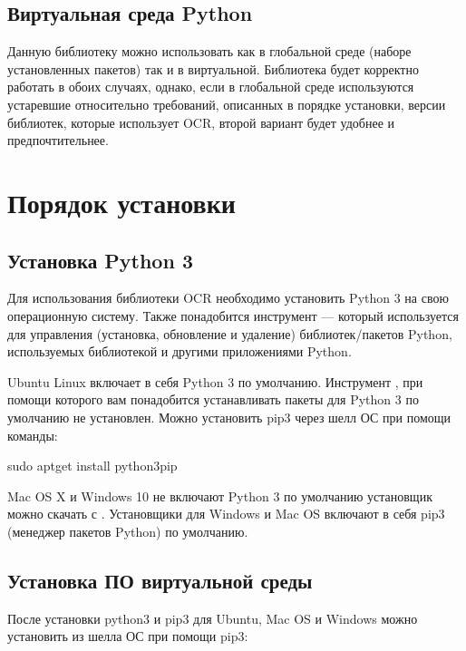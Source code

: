 \documentclass[letterpaper,10pt,russian]{sphinxmanual}
\begin{document}
\subsection{Виртуальная среда Python}
\label{\detokenize{Installation:id4}}
Данную библиотеку можно использовать как в глобальной среде (наборе установленных пакетов) так и в виртуальной. Библиотека будет корректно работать в обоих случаях, однако, если в глобальной среде используются устаревшие относительно требований, описанных в порядке установки, версии библиотек, которые использует OCR, второй вариант будет удобнее и предпочтительнее.


\section{Порядок установки}
\label{\detokenize{Installation:id5}}

\subsection{Установка Python 3}
\label{\detokenize{Installation:python-3}}
Для использования библиотеки OCR необходимо установить Python 3 на свою операционную систему. Также понадобится инструмент  — который используется для управления (установка, обновление и удаление) библиотек/пакетов Python, используемых библиотекой и другими приложениями Python.

Ubuntu Linux включает в себя Python 3 по умолчанию. Инструмент , при помощи которого вам понадобится устанавливать пакеты для Python 3 по умолчанию не установлен. Можно установить pip3 через шелл ОС при помощи команды:

\begin{sphinxVerbatim}[commandchars=\\\{\}]
sudo apt\PYGZhy{}get install python3\PYGZhy{}pip
\end{sphinxVerbatim}

Mac OS X и Windows 10 не включают Python 3 по умолчанию \textendash{} установщик можно скачать с . Установщики для Windows и Mac OS включают в себя pip3 (менеджер пакетов Python) по умолчанию.


\subsection{Установка ПО виртуальной среды}
\label{\detokenize{Installation:id7}}
После установки python3 и pip3 для Ubuntu, Mac OS и Windows можно установить  из шелла ОС при помощи pip3:
\end{document}
